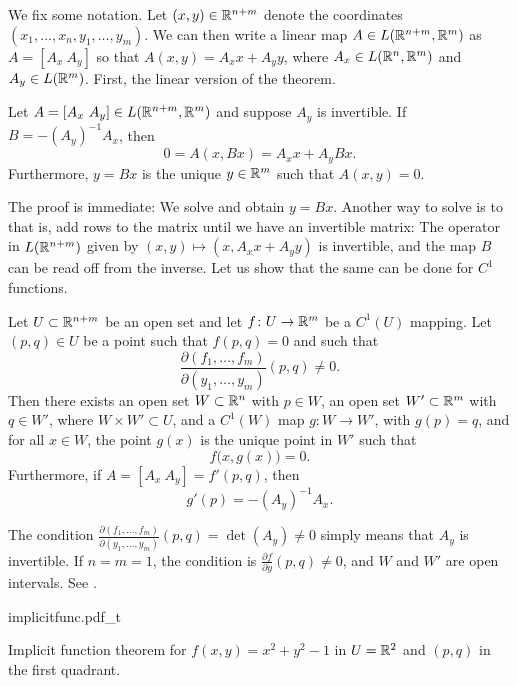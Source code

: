 We fix some notation.  Let $(x,y) \in
{\mathbb{R}}^{n+m}$ denote the coordinates $(x_1,\ldots,x_n,y_1,\ldots,y_m)$.  
We can then write a
linear map $A \in L({\mathbb{R}}^{n+m},{\mathbb{R}}^m)$ as
$A = [ A_x ~ A_y ]$ so that $A(x,y) = A_x x + A_y y$,
where $A_x \in L({\mathbb{R}}^n,{\mathbb{R}}^m)$ and
$A_y \in L({\mathbb{R}}^m)$.
First, the linear version of the theorem.

\begin{prop}
Let $A = [A_x~A_y] \in L({\mathbb{R}}^{n+m},{\mathbb{R}}^m)$ and suppose 
$A_y$ is invertible.  If $B = - {(A_y)}^{-1} A_x$, then
\begin{equation*}
0 = A ( x, Bx) = A_x x + A_y Bx .
\end{equation*}
Furthermore, $y=Bx$ is the unique $y \in {\mathbb{R}}^m$ such that $A(x,y) = 0$.
\end{prop}

The proof is immediate: We solve and obtain $y = Bx$.
Another way to solve is to  that is, add
rows to the matrix until we have an invertible matrix:
The operator in $L({\mathbb{R}}^{n+m})$ given by
$(x,y) \mapsto (x,A_x x + A_y y)$
is invertible, and the map $B$
can be read off from the inverse.
Let us show that the same can be done for $C^1$ functions.

\begin{thm}
\label{thm:implicit}
Let $U \subset {\mathbb{R}}^{n+m}$ be an open set and let $f \colon U \to {\mathbb{R}}^m$
be a $C^1(U)$ mapping.  Let $(p,q) \in U$ be a point such that
$f(p,q) = 0$ and such that
\begin{equation*}
\frac{\partial(f_1,\ldots,f_m)}{\partial(y_1,\ldots,y_m)} (p,q)  \neq 0 .
\end{equation*}
Then there exists an
open set $W \subset {\mathbb{R}}^n$ with $p \in W$,
an open set $W' \subset {\mathbb{R}}^m$ with $q \in W'$,
where $W \times W' \subset U$,
and
a $C^1(W)$ map $g \colon W \to W'$, with $g(p) = q$, and
for all $x \in W$, the point $g(x)$ is the unique point in $W'$
such that 
\begin{equation*}
f\bigl(x,g(x)\bigr) = 0 .
\end{equation*}
Furthermore, if $A = [ A_x ~ A_y ] = f'(p,q)$, then
\begin{equation*}
g'(p) = -{(A_y)}^{-1}A_x .
\end{equation*}
\end{thm}

The condition
$\frac{\partial(f_1,\ldots,f_m)}{\partial(y_1,\ldots,y_m)} (p,q) =
\det(A_y)  \neq 0$
simply means that $A_y$ is invertible.  If $n=m=1$, the condition 
is $\frac{\partial f}{\partial y}(p,q) \not= 0$, and $W$ and $W'$ are 
open intervals.  See .
\begin{myfigureht}
{implicitfunc.pdf_t}
\caption{Implicit function theorem for $f(x,y) = x^2+y^2-1$ in $U={\mathbb{R}}^2$ and
$(p,q)$ in the first quadrant.\label{fig:implicitfunc}}
\end{myfigureht}

